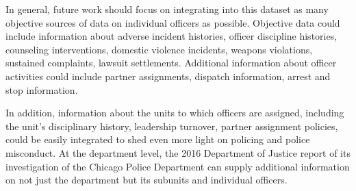 In general, future work should focus on integrating into this dataset as many
objective sources of data on individual officers as possible. Objective data
could include information about adverse incident histories, officer discipline
histories, counseling interventions, domestic violence incidents, weapons
violations, sustained complaints, lawsuit settlements. Additional information
about officer activities could include partner assignments, dispatch
information, arrest and stop information. 

In addition, information about the units to which officers are assigned,
including the unit's disciplinary history, leadership turnover, partner
assignment policies, could be easily integrated to shed even more light on
policing and police misconduct. At the department level, the 2016 Department of
Justice report of its investigation of the Chicago Police Department can supply
additional information on not just the department but its subunits and
individual officers.

